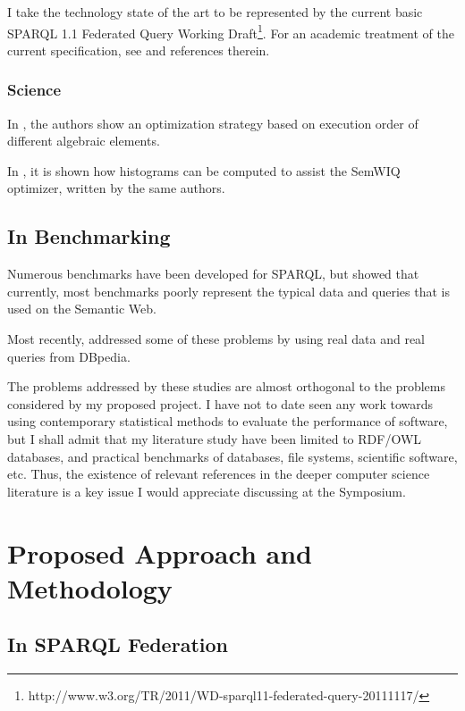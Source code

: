 \documentclass{llncs}
\begin{document}
I take the technology state of the art to be represented by the
current basic SPARQL 1.1 Federated Query Working
Draft\footnote{http://www.w3.org/TR/2011/WD-sparql11-federated-query-20111117/}. For
an academic treatment of the current specification, see
\cite{springerlink:10.1007/978-3-642-21064-8_1} and references therein.

\subsubsection{Science}

In \cite{springerlink:10.1007/978-3-642-21064-8_1}, the authors show
an optimization strategy based on execution order of different
algebraic elements. %

In \cite{5337556}, it is shown how histograms can be computed to
assist the SemWIQ optimizer, written by the same authors.

\subsection{In Benchmarking}

Numerous benchmarks have been developed for SPARQL, but
\cite{Duan:2011:AOC:1989323.1989340} showed that currently, most
benchmarks poorly represent the typical data and queries that is used
on the Semantic Web.

Most recently, \cite{mxro:Morsey2011DBpedia} addressed some of these
problems by using real data and real queries from DBpedia.

The problems addressed by these studies are almost orthogonal to the
problems considered by my proposed project. I have not to date seen
any work towards using contemporary statistical methods to evaluate
the performance of software, but I shall admit that my literature
study have been limited to RDF/OWL databases, and practical benchmarks
of databases, file systems, scientific software, etc. Thus, the
existence of relevant references in the deeper computer science
literature is a key issue I would appreciate discussing at the
Symposium.


\section{Proposed Approach and Methodology}

\subsection{In SPARQL Federation}
\end{document}
